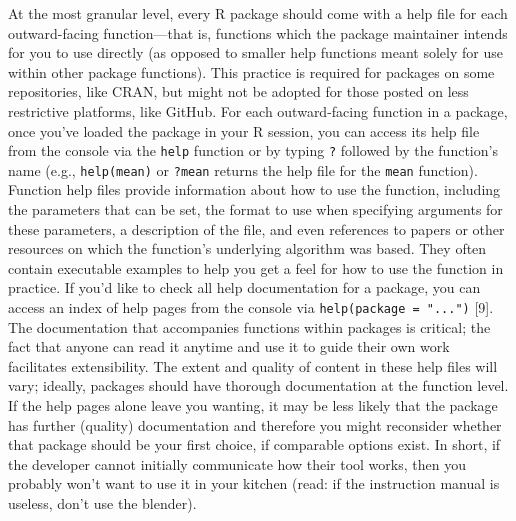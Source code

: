 \documentclass[10pt,letterpaper]{article}
\begin{document}
At the most granular level, every R package should come with a help file
for each outward-facing function---that is, functions which the package
maintainer intends for you to use directly (as opposed to smaller help
functions meant solely for use within other package functions). This
practice is required for packages on some repositories, like CRAN, but
might not be adopted for those posted on less restrictive platforms,
like GitHub. For each outward-facing function in a package, once you've
loaded the package in your R session, you can access its help file from
the console via the \texttt{help} function or by typing \texttt{?}
followed by the function's name (e.g., \texttt{help(mean)} or
\texttt{?mean} returns the help file for the \texttt{mean} function).
Function help files provide information about how to use the function,
including the parameters that can be set, the format to use when
specifying arguments for these parameters, a description of the file,
and even references to papers or other resources on which the function's
underlying algorithm was based. They often contain executable examples
to help you get a feel for how to use the function in practice. If you'd
like to check all help documentation for a package, you can access an
index of help pages from the console via
\texttt{help(package\ =\ "...")} {[}9{]}. The documentation that
accompanies functions within packages is critical; the fact that anyone
can read it anytime and use it to guide their own work facilitates
extensibility. The extent and quality of content in these help files
will vary; ideally, packages should have thorough documentation at the
function level. If the help pages alone leave you wanting, it may be
less likely that the package has further (quality) documentation and
therefore you might reconsider whether that package should be your first
choice, if comparable options exist. In short, if the developer cannot
initially communicate how their tool works, then you probably won't want
to use it in your kitchen (read: if the instruction manual is useless,
don't use the blender).
\end{document}
